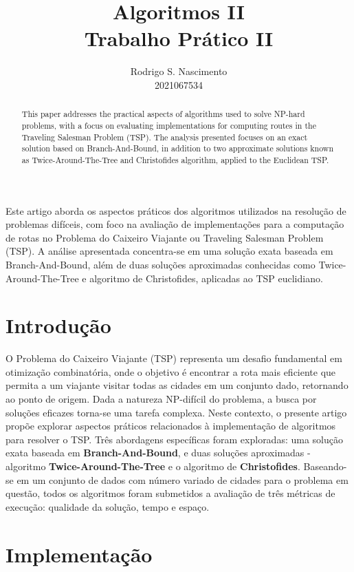 \documentclass[12pt]{article}
\title{Algoritmos II\\ Trabalho Prático II}
\author{Rodrigo S. Nascimento\inst{1} \\2021067534}
\begin{document}
 

\maketitle

\begin{abstract}
  This paper addresses the practical aspects of algorithms used to solve NP-hard problems, with a focus on evaluating implementations for computing routes in the Traveling Salesman Problem (TSP). The analysis presented focuses on an exact solution based on Branch-And-Bound, in addition to two approximate solutions known as Twice-Around-The-Tree and Christofides algorithm, applied to the Euclidean TSP.
\end{abstract}
     
\begin{resumo} 
  Este artigo aborda os aspectos práticos dos algoritmos utilizados na resolução de problemas difíceis, com foco na avaliação de implementações para a computação de rotas no Problema do Caixeiro Viajante ou Traveling Salesman Problem (TSP). A análise apresentada concentra-se em uma solução exata baseada em Branch-And-Bound, além de duas soluções aproximadas conhecidas como Twice-Around-The-Tree e algoritmo de Christofides, aplicadas ao TSP euclidiano.
\end{resumo}


\section{Introdução}

O Problema do Caixeiro Viajante (TSP) representa um desafio fundamental em otimização combinatória, onde o objetivo é encontrar a rota mais eficiente que permita a um viajante visitar todas as cidades em um conjunto dado, retornando ao ponto de origem. Dada a natureza NP-difícil do problema, a busca por soluções eficazes torna-se uma tarefa complexa. Neste contexto, o presente artigo propõe explorar aspectos práticos relacionados à implementação de algoritmos para resolver o TSP. Três abordagens específicas foram exploradas: uma solução exata baseada em \textbf{Branch-And-Bound}, e duas soluções aproximadas - algoritmo \textbf{Twice-Around-The-Tree} e o algoritmo de \textbf{Christofides}. Baseando-se em um conjunto de dados com número variado de cidades para o problema em questão, todos os algoritmos foram submetidos a avaliação de três métricas de execução: qualidade da solução, tempo e espaço.

\section{Implementação} \label{sec:firstpage}
\end{document}
